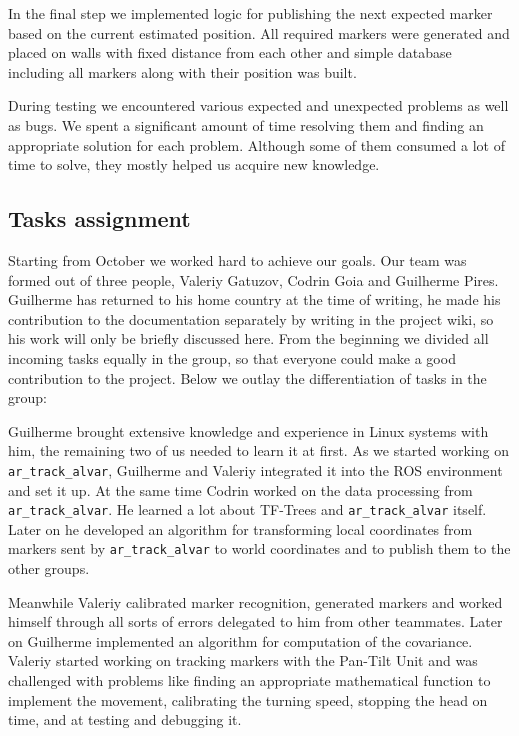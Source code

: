 In the final step we implemented logic for publishing the next expected marker based on the current estimated position. All required markers were generated and placed on walls with fixed distance from each other and simple database including all markers along with their position was built.

During testing we encountered various expected and unexpected problems as well as bugs. We spent a significant amount of time resolving them and finding an appropriate solution for each problem. Although some of them consumed a lot of time to solve, they mostly helped us acquire new knowledge.

\subsection{Tasks assignment}

Starting from October we worked hard to achieve our goals. Our team was formed out of three people, Valeriy Gatuzov, Codrin Goia and Guilherme Pires. Guilherme has returned to his home country at the time of writing, he made his contribution to the documentation separately by writing in the project wiki, so his work will only be briefly discussed here. From the beginning we divided all incoming tasks equally in the group, so that everyone could make a good contribution to the project. Below we outlay the differentiation of tasks in the group:

Guilherme brought extensive knowledge and experience in Linux systems with him, the remaining two of us needed to learn it at first. As we started working on \texttt{ar\_track\_alvar}, Guilherme and Valeriy integrated it into the ROS environment and set it up. At the same time Codrin worked on the data processing from \texttt{ar\_track\_alvar}. He learned a lot about TF-Trees and \texttt{ar\_track\_alvar} itself. Later on he developed an algorithm for transforming local coordinates from markers sent by \texttt{ar\_track\_alvar} to world coordinates and to publish them to the other groups.

Meanwhile Valeriy calibrated marker recognition, generated markers and worked himself through all sorts of errors delegated to him from other teammates. Later on Guilherme implemented an algorithm for computation of the covariance. Valeriy started working on tracking markers with the Pan-Tilt Unit and was challenged with problems like finding an appropriate mathematical function to implement the movement, calibrating the turning speed, stopping the head on time, and at testing and debugging it.

